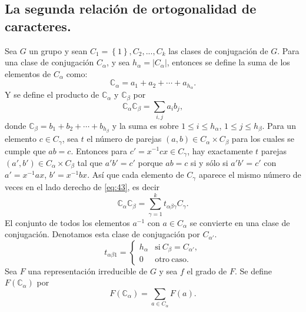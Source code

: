 \documentclass[12pt]{book}
\theoremstyle{definition}
\newcounter{in}
\begin{document}
\subsection{La segunda relación de ortogonalidad de caracteres.}
\label{subsec:sroc}
Sea $G$ un grupo y sean $C_{1}=\left\{1 \right\},C_{2},...,C_{k}$ las
clases de conjugación de $G$. Para una clase de conjugación
$C_{\alpha}$, y sea $h_{\alpha}=|C_{\alpha}|$, entonces se define la
suma de los elementos de $C_{\alpha}$ como:
\begin{equation}
  \label{eq:42}
  \mathbb{C}_{\alpha}=a_{1}+a_{2}+ \cdots + a_{h_{\alpha}}.
\end{equation}
Y se define el producto de $\mathbb{C}_{\alpha}$ y $\mathbb{C}_{\beta}$ por
\begin{equation}
  \label{eq:43}
  \mathbb{C}_{\alpha} \mathbb{C}_{\beta} = \sum_{i,j} a_{i} b_{j},
\end{equation}
donde $\mathbb{C}_{\beta}=b_1+b_{2}+ \cdots + b_{h_{\beta}}$ y la suma es sobre
$1 \leq i \leq h_{\alpha}$, $1 \leq j \leq h_{\beta}$. Para un
elemento $c \in C_{\gamma}$, sea $t$ el número de parejas
$(a,b) \in C_{\alpha} \times C_{\beta}$ para los cuales se cumple que $ab=c$. Entonces para
$c'=x^{-1}cx \in C_{\gamma}$, hay exactamente $t$
parejas~$(a',b') \in C_{\alpha} \times C_{\beta}$ tal que $a'b'=c'$
porque $ab=c$ si y sólo si $a'b'=c'$ con $a'=x^{-1}ax$,
$b'=x^{-1}bx$. Así que cada elemento de $C_{\gamma}$ aparece el mismo
número de veces en el lado derecho de \ref{eq:43}, es decir
\begin{equation}
  \label{eq:44}
  \mathbb{C}_{\alpha} \mathbb{C}_{\beta} = \sum_{\gamma=1}^{k} t_{\alpha \beta \gamma} C_{\gamma}.
\end{equation}
El conjunto de todos los elementos $a^{-1}$ con $a \in C_{\alpha}$ se
convierte en una clase de conjugación. Denotamos esta clase de
conjugación por $C_{\alpha '}$.
\begin{equation}
  \label{eq:46}
   t_{\alpha \beta 1} = \left\{
     \begin{array}{ll}
       h_{\alpha}      & \mathrm{si\ } C_{\beta} = C_{\alpha '}, \\
       0      & \mathrm{otro\ caso.\ } 
     \end{array}
   \right.
\end{equation}
Sea $F$ una representación irreducible
de $G$ y sea $f$ el grado de $F$. Se define
$F (\mathbb{C}_{\alpha})$ por
\begin{equation}
  \label{eq:45}
  F (\mathbb{C}_{\alpha}) = \sum_{a \in C_{\alpha}} F(a).
\end{equation}
\end{document}
